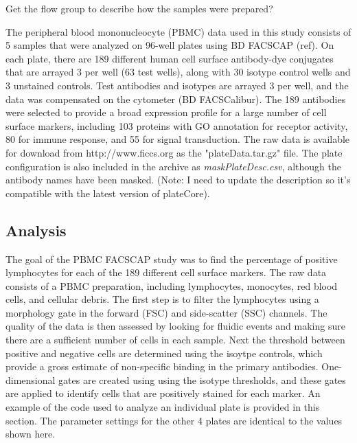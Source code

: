\documentclass[12pt]{article}
\begin{document}
Get the flow group to describe how the samples were prepared?

The peripheral blood mononucleocyte (PBMC) data used in this study consists of 5 samples that were analyzed on 96-well plates
using BD FACS\texttrademark CAP (ref). On each plate, there are 189 different human cell surface antibody-dye conjugates that
are arrayed 3 per well (63 test wells), along with 30 isotype control wells and 3 unstained controls.
Test antibodies and isotypes are arrayed 3 per well, and the data was compensated
on the cytometer (BD FACSCalibur\texttrademark). The 189 antibodies were selected to provide a broad expression profile
for a large number of cell surface markers, including 103 proteins with GO annotation for receptor activity, 80
for immune response, and 55 for signal transduction. The raw data is available for download from http://www.ficcs.org as the
"plateData.tar.gz" file. The plate configuration is also included in the archive as \textit{maskPlateDesc.csv}, although
the antibody names have been masked. (Note: I need to update the description so it's compatible with the latest version of plateCore).

\subsection*{Analysis}

The goal of the PBMC FACS\texttrademark CAP study was to find the percentage of positive lymphocytes for each of the 189 different cell
surface markers. The raw data consists of a PBMC preparation, including lymphocytes, monocytes, red blood cells, and cellular 
debris. The first step is to filter the lymphocytes using a morphology gate in the forward (FSC) and side-scatter (SSC) channels. 
The quality of the data is then assessed by looking for fluidic events and making sure there are a sufficient number of cells in each
sample. Next the threshold between positive and negative cells are determined using the isoytpe controls, which provide a gross estimate
of non-specific binding in the primary antibodies. One-dimensional gates are created using using the isotype thresholds, and these
gates are applied to identify cells that are positively stained for each marker. An example of the code used to analyze an individual
plate is provided in this section.  The parameter settings for the other 4 plates are identical to the values shown here.
\end{document}
